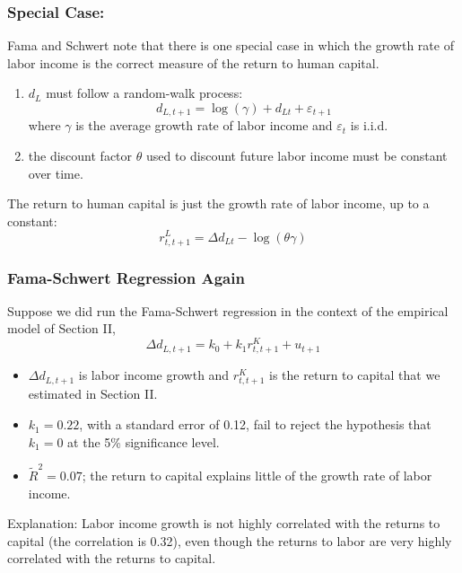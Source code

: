 \documentclass[10pt]{beamer}
\begin{document}
\begin{frame}[c]\frametitle{Special Case:}

Fama and Schwert note that there is one special case in which the growth rate of labor income is the correct measure of the return to human capital.
\begin{enumerate}
    \item $d_{L}$ must follow a random-walk process:
    \begin{equation}
        d_{L,t+1} =  \log(\gamma) + d_{Lt} + \varepsilon_{t+1}
    \end{equation}
    where $\gamma$ is the average growth rate of labor income and $\varepsilon_{t}$ is i.i.d.
    \item the discount factor $\theta$ used to discount future labor income must be constant over time.
\end{enumerate}
The return to human capital is just the growth rate of labor income, up to a constant:
\begin{equation}
    r_{t,t+1}^{L} = \Delta d_{Lt} -\log(\theta \gamma)
\end{equation}


\end{frame}

\begin{frame}[c]\frametitle{Fama-Schwert Regression Again}
Suppose we did run the Fama-Schwert regression in the context of the empirical model of Section II,
\begin{equation}
    \Delta d_{L,t+1} = k_{0} + k_{1} r_{t,t+1}^{K} + u_{t+1}
\end{equation}
\begin{itemize}
    \item $\Delta d_{L,t+1}$ is labor income growth and $r_{t,t+1}^{K}$ is the return to capital that we estimated in Section II.
    \item $k_{1} = 0.22$, with a standard error of 0.12, fail to reject the hypothesis that $k_{1}=0$ at the 5\% significance level.
    \item $\tilde{R}^{2} = 0.07$; the return to capital explains little of the growth rate of labor income.
\end{itemize}


\alert{Explanation}: Labor income growth is not highly correlated with the returns to capital (the correlation is 0.32), even though the  returns to labor are very highly correlated with the returns to capital.
\end{frame}
\end{document}
